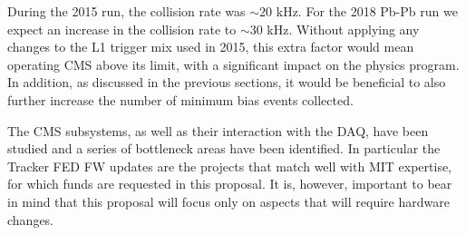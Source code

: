 During the 2015 run, the collision rate was $\sim 20$ kHz. For the 2018 Pb-Pb run we expect an increase in the collision rate to $\sim 30$ kHz. Without applying any changes to the L1 trigger mix used in 2015, this extra factor would mean operating CMS above its limit, with a significant impact on the physics program. In addition, as discussed in the previous sections, it would be beneficial to also further increase the number of minimum bias events collected. 

The CMS subsystems, as well as their interaction with the DAQ, have been studied and a series of bottleneck areas have been identified. 
In particular the Tracker FED FW 
updates are the projects that match well with MIT expertise, for which funds are requested in this proposal.
It is, however, important to bear in mind that this proposal will focus only on aspects that will require hardware changes. 

